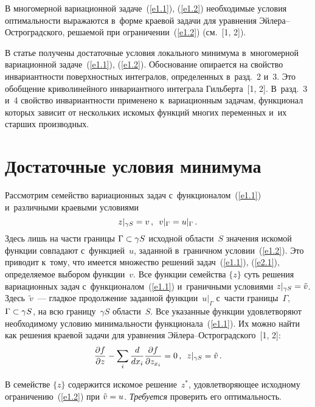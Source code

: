 \begin{multicols}{2}
    В многомерной вариационной задаче~(\ref{e1.1}), (\ref{e1.2}) необходимые 
условия оптимальности выражаются в~форме краевой задачи для уравнения  
Эй\-ле\-ра--Ост\-ро\-град\-ско\-го, решаемой при ограничении~(\ref{e1.2}) (см.\ [1, 
2]). 
    
    В статье получены достаточные условия локального минимума в~многомерной 
вариационной задаче~(\ref{e1.1}), (\ref{e1.2}). Обоснование опирается на свойство 
инвариантности поверхностных интегралов, определенных в~разд.~2 и~3. Это 
обобщение криволинейного инвариантного интеграла Гильберта~[1, 2]. В~разд.~3 
и~4 свойство инвариантности применено к~вариационным задачам, функционал 
которых зависит от нескольких искомых функций многих переменных и~их старших 
производных.
    
\section{Достаточные условия минимума }

    Рассмотрим семейство вариационных задач с~функционалом~(\ref{e1.1}) 
и~различными краевыми условиями 
    \begin{equation}
    z\vert_{\gamma S} =v\,,\enskip v\vert_{\Gamma}=u\vert_{\Gamma}\,.
    \label{e2.1}
    \end{equation}
Здесь лишь на части границы $\Gamma\hm\subset \gamma S$ исходной области~$S$ 
значения искомой функции совпадают с~функцией~$u$, заданной в~граничном 
условии~(\ref{e1.2}). Это приводит к~тому, что имеется множество решений 
задач~(\ref{e1.1}), (\ref{e2.1}), определяемое выбором функции~$v$. Все функции 
семейства $\{z\}$ суть решения вариационных задач с~функционалом~(\ref{e1.1}) 
и~граничными условиями $z\vert_{\gamma S}\hm= \tilde{v}$. Здесь~$\tilde{v}$~--- 
гладкое продолжение заданной функции~$u\vert_\Gamma$ с~части 
границы~$\Gamma$, $\Gamma\hm\subset \gamma S$, на всю границу~$\gamma S$ 
области~$S$. Все указанные функции удовлетворяют необходимому условию 
минимальности функционала~(\ref{e1.1}). Их можно найти как решения краевой 
задачи для уравнения Эй\-ле\-ра--Ост\-ро\-град\-ско\-го~[1, 2]:
\begin{equation}
\displaystyle\frac{\displaystyle \partial f\mathstrut}{\displaystyle \partial z\mathstrut} -\sum\limits_i \displaystyle\frac{\displaystyle d\mathstrut}{\displaystyle dx_i\mathstrut} \displaystyle\frac{\displaystyle \partial f\mathstrut}{\displaystyle \partial z_{x_i}\mathstrut}=0\,,\enskip z\vert_{\gamma S}=\tilde{v}\,.
\label{e2.2}
\end{equation}
    
    В семействе $\{z\}$ содержится искомое решение~$z^*$, удовлетворяющее 
исходному ограничению~(\ref{e1.2}) при $\tilde{v}\hm=u$. \textit{Требуется} 
проверить его оптимальность. 
    

\end{multicols}
